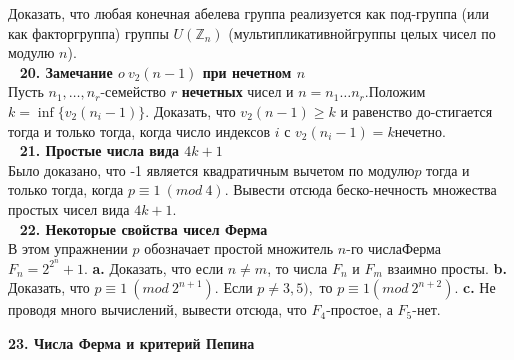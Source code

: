 \documentclass{mai_book}
\begin{document}
    Доказать, что любая конечная абелева группа реализуется как под-\newline группа (или как факторгруппа) группы $U(\mathbb{Z}_n)$ (мультипликативной\newline группы целых чисел по модулю $n$).\\
    \ \newline
\noindent\textbf{20. Замечание $o\ v_2(n-1)$ при нечетном $n$}\\

    Пусть $n_1,\ldots,n_r$-семейство $r$ \textbf{нечетных} чисел и $n=n_1\ldots n_r.$\newline Положим $k=\inf \{v_2(n_i-1)\}.$ Доказать, что $v_2(n-1)\geqslant k$ и равенство до-\newline стигается тогда и только тогда, когда число индексов $i$ с $v_2(n_i-1)=k$\newline нечетно.\\
\ \newline
\noindent\textbf{21. Простые числа вида $4k+1$}\\

    Было доказано, что -1 является квадратичным вычетом по модулю\newline $p$ тогда и только тогда, когда $p\equiv 1\ (mod\ 4)$. Вывести отсюда беско-\newline нечность множества простых чисел вида $4k+1.$\\
\ \newline
\noindent\textbf{22. Некоторые свойства чисел Ферма}\\

    В этом упражнении $p$ обозначает простой множитель $n$-го числа\newline Ферма $F_n=2^{2^n}+1.$\newline
\hspace*{15pt}\textbf{a.} Доказать, что если $n\neq m$, то числа $F_n$ и $F_m$ взаимно просты.\newline
\hspace*{15pt}\textbf{b.} Доказать, что $p\equiv 1\ (mod\ 2^{n+1}).$ Если $p\neq 3,5),$ то $p\equiv 1$\newline $(mod\ 2^{n+2}).$\newline
\hspace*{15pt}\textbf{c.} Не проводя много вычислений, вывести отсюда, что $F_4$-простое, а $F_5$-нет.
    
\newpage

\noindent\textbf{23. Числа Ферма и критерий Пепина}\\
\end{document}
